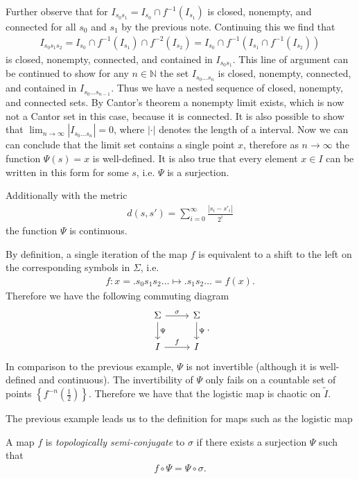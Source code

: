 \begin{ex}
Further observe that for $I_{s_0s_1}=I_{s_0}\cap f^{-1}(I_{s_1})$ is closed, nonempty, and connected for all $s_0$ and $s_1$ by the previous note. Continuing this we find that
\begin{align}
	I_{s_0s_1s_2} = I_{s_0} \cap f^{-1}(I_{s_1}) \cap f^{-2}(I_{s_2}) = I_{s_0} \cap f^{-1} \left( I_{s_1} \cap f^{-1}(I_{s_2})\right) 
\end{align}
is closed, nonempty, connected, and contained in $I _{s_0s_1}$. This line of argument can be continued to show for any $n \in \mathbb{N}$ the set $I_{s_0\ldots s_n}$ is closed, nonempty, connected, and contained in $I_{s_0 \ldots s_{n-1}}$. Thus we have a nested sequence of closed, nonempty, and connected sets. By Cantor's theorem a nonempty limit exists, which is now not a Cantor set in this case, because it is connected. It is also possible to show that $\lim_{n\to \infty }|I_{s_0 \ldots s_n}| = 0$, where $|\cdot|$ denotes the length of a interval. Now we can can conclude that the limit set contains a single point $x$, therefore as $n\to \infty $ the function $\Psi(s)=x$ is well-defined. It is also true that every element $x\in I$ can be written in this form for some $s$, i.e. $\Psi$ is a surjection.

 Additionally with the metric
 \begin{align}
	 d(s,s') = \sum_{i=0}^{\infty } \frac{|s_i - s'_i|}{2^{i}}	
 \end{align}
the function $\Psi$ is continuous. 

By definition, a single iteration of the map $f$ is equivalent to a shift to the left on the corresponding symbols in $\Sigma$, i.e.
\begin{align}
	f: x= \bm{.} s_0 s_1 s_2 \ldots \mapsto \bm{.} s_1 s_2 \ldots = f(x).
\end{align}
Therefore we have the following commuting diagram
\begin{equation}
\begin{tikzcd}
	\Sigma \arrow[r, "\sigma"] \arrow[d,"\Psi"] 
& \Sigma \arrow[d, "\Psi"] \\
I \arrow[r, "{f}"]
& I 
\end{tikzcd}.
\end{equation}
In comparison to the previous example, $\Psi$ is not invertible (although it is well-defined and continuous). The invertibility of $\Psi $ only fails on a countable set of points $\left \{ f^{-n}\left(\frac{1}{2}\right) \right \}$. Therefore we have that the logistic map is chaotic on $\tilde{I}$.
 \end{ex}

 The previous example leads us to the definition for maps such as the logistic map
\begin{definition}
	A map $f$ is \emph{topologically semi-conjugate} to $\sigma$ if there exists a surjection $\Psi$ such that
	\begin{align}
		\boxed{
			f \circ \Psi = \Psi \circ \sigma.
		}
	\end{align}
\end{definition}
 
